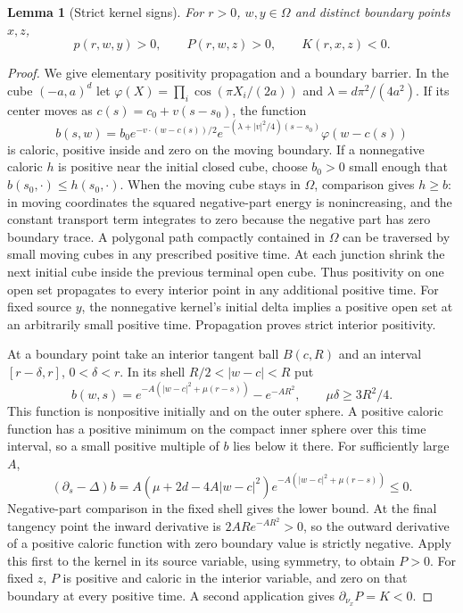\documentclass[11pt]{article}
\newtheorem{lemma}[theorem]{Lemma}
\theoremstyle{remark}
\newcommand{\Om}{\Omega}
\begin{document}
\begin{lemma}[Strict kernel signs]\label{lem:sign}
For $r>0$, $w,y\in\Om$ and distinct boundary points $x,z$,
\[
 p(r,w,y)>0,\qquad P(r,w,z)>0,\qquad K(r,x,z)<0 .
\]
\end{lemma}
\begin{proof}
We give elementary positivity propagation and a boundary barrier.
In the cube $(-a,a)^d$ let
$\varphi(X)=\prod_i\cos(\pi X_i/(2a))$ and
$\lambda=d\pi^2/(4a^2)$.
If its center moves as $c(s)=c_0+v(s-s_0)$, the function
\[
 b(s,w)=b_0e^{-v\cdot(w-c(s))/2}
 e^{-(\lambda+|v|^2/4)(s-s_0)}\varphi(w-c(s))
\]
is caloric, positive inside and zero on the moving boundary.
If a nonnegative caloric $h$ is positive near the initial closed cube,
choose $b_0>0$ small enough that $b(s_0,\cdot)\leq h(s_0,\cdot)$.
When the moving cube stays in $\Om$, comparison gives $h\geq b$:
in moving coordinates the squared negative-part energy is nonincreasing,
and the constant transport term integrates to zero because the negative
part has zero boundary trace.
A polygonal path compactly contained in $\Om$ can be traversed by small
moving cubes in any prescribed positive time.
At each junction shrink the next initial cube inside the previous
terminal open cube. Thus positivity on one open set propagates to every
interior point in any additional positive time.
For fixed source $y$, the nonnegative kernel's initial delta implies a
positive open set at an arbitrarily small positive time.
Propagation proves strict interior positivity.

At a boundary point take an interior tangent ball $B(c,R)$ and an interval
$[r-\delta,r]$, $0<\delta<r$.
In its shell $R/2<|w-c|<R$ put
\[
 b(w,s)=e^{-A(|w-c|^2+\mu(r-s))}-e^{-AR^2},
                 \qquad \mu\delta\geq3R^2/4.
\]
This function is nonpositive initially and on the outer sphere.
A positive caloric function has a positive minimum on the compact inner
sphere over this time interval, so a small positive multiple of $b$
lies below it there.
For sufficiently large $A$,
\[
 (\partial_s-\Delta)b
   =A(\mu+2d-4A|w-c|^2)e^{-A(|w-c|^2+\mu(r-s))}\leq0.
\]
Negative-part comparison in the fixed shell gives the lower bound.
At the final tangency point the inward derivative is
$2AR e^{-AR^2}>0$, so the outward derivative of a positive caloric
function with zero boundary value is strictly negative.
Apply this first to the kernel in its source variable, using symmetry,
to obtain $P>0$.
For fixed $z$, $P$ is positive and caloric in the interior variable,
and zero on that boundary at every positive time.
A second application gives $\partial_{\nu_x}P=K<0$.
\end{proof}
\end{document}

